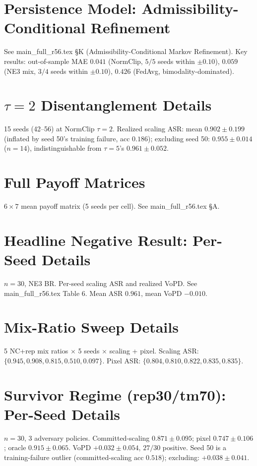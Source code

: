 \documentclass{article}
\begin{document}
\section{Persistence Model: Admissibility-Conditional Refinement}
\label{app:persistence_details}
See main\_full\_r56.tex §K (Admissibility-Conditional Markov Refinement). Key results: out-of-sample MAE $0.041$ (NormClip, $5/5$ seeds within $\pm 0.10$), $0.059$ (NE3 mix, $3/4$ seeds within $\pm 0.10$), $0.426$ (FedAvg, bimodality-dominated).

\section{$\tau=2$ Disentanglement Details}
\label{app:tau2}
15 seeds (42--56) at NormClip $\tau=2$. Realized scaling ASR: mean $0.902 \pm 0.199$ (inflated by seed 50's training failure, acc $0.186$); excluding seed 50: $0.955 \pm 0.014$ ($n=14$), indistinguishable from $\tau=5$'s $0.961 \pm 0.052$.

\section{Full Payoff Matrices}
\label{app:payoff}
$6 \times 7$ mean payoff matrix (5 seeds per cell). See main\_full\_r56.tex §A.

\section{Headline Negative Result: Per-Seed Details}
\label{app:headline}
$n=30$, NE3 BR. Per-seed scaling ASR and realized VoPD. See main\_full\_r56.tex Table 6. Mean ASR $0.961$, mean VoPD $-0.010$.

\section{Mix-Ratio Sweep Details}
\label{app:mixratio}
5 NC+rep mix ratios $\times$ 5 seeds $\times$ scaling + pixel. Scaling ASR: $\{0.945, 0.908, 0.815, 0.510, 0.097\}$. Pixel ASR: $\{0.804, 0.810, 0.822, 0.835, 0.835\}$.

\section{Survivor Regime (rep30/tm70): Per-Seed Details}
\label{app:survivor}
$n=30$, 3 adversary policies. Committed-scaling $0.871\pm0.095$; pixel $0.747\pm0.106$; oracle $0.915\pm0.065$. VoPD $+0.032\pm0.054$, $27/30$ positive. Seed 50 is a training-failure outlier (committed-scaling acc $0.518$); excluding: $+0.038\pm0.041$.
\end{document}
